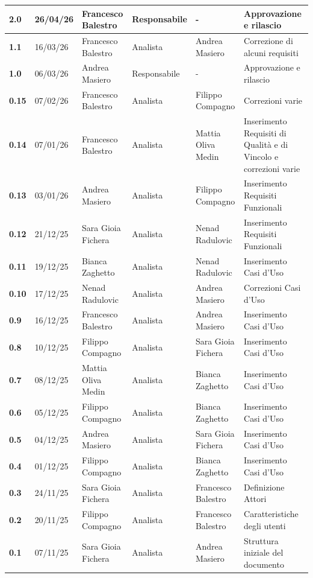 \documentclass[a4paper,12pt]{article}
\begin{document}
{\begin{longtable}{|p{1cm}|p{1.7cm}|p{3.5cm}|p{2.5cm}|p{2.5cm}|p{3.2cm}|}
            \textbf{2.0} & 26/04/26 & Francesco Balestro & Responsabile & - & Approvazione e rilascio \\
            \hline
            \textbf{1.1} & 16/03/26 & Francesco Balestro & Analista & Andrea Masiero & Correzione di alcuni requisiti \\
            \hline
            \textbf{1.0} & 06/03/26 & Andrea Masiero & Responsabile & - & Approvazione e rilascio \\
            \hline
            \textbf{0.15} & 07/02/26 & Francesco Balestro & Analista & Filippo Compagno & Correzioni varie \\
            \hline
            \textbf{0.14} & 07/01/26 & Francesco Balestro & Analista & Mattia Oliva Medin & Inserimento Requisiti di Qualità e di Vincolo e correzioni varie \\
            \hline
            \textbf{0.13} & 03/01/26 & Andrea Masiero & Analista & Filippo Compagno & Inserimento Requisiti Funzionali \\
            \hline
            \textbf{0.12} & 21/12/25 &  Sara Gioia Fichera & Analista & Nenad Radulovic & Inserimento Requisiti Funzionali \\
            \hline
            \textbf{0.11} & 19/12/25 & Bianca Zaghetto & Analista & Nenad Radulovic & Inserimento Casi d'Uso \\
            \hline
            \textbf{0.10} & 17/12/25 & Nenad Radulovic & Analista & Andrea Masiero & Correzioni Casi d'Uso \\
            \hline
            \textbf{0.9} & 16/12/25 & Francesco Balestro & Analista & Andrea Masiero & Inserimento Casi d'Uso \\
            \hline
            \textbf{0.8} & 10/12/25 & Filippo Compagno & Analista & Sara Gioia Fichera & Inserimento Casi d'Uso \\
            \hline
            \textbf{0.7} & 08/12/25 & Mattia Oliva Medin & Analista & Bianca Zaghetto & Inserimento Casi d'Uso \\
            \hline
            \textbf{0.6} & 05/12/25 & Filippo Compagno & Analista & Bianca Zaghetto & Inserimento Casi d'Uso \\
            \hline
            \textbf{0.5} & 04/12/25 & Andrea Masiero & Analista & Sara Gioia Fichera & Inserimento Casi d'Uso \\
            \hline
            \textbf{0.4} & 01/12/25 & Filippo Compagno & Analista & Bianca Zaghetto & Inserimento Casi d'Uso \\
            \hline
            \textbf{0.3} & 24/11/25 & Sara Gioia Fichera & Analista & Francesco Balestro &  Definizione Attori \\
            \hline
            \textbf{0.2} & 20/11/25 & Filippo Compagno & Analista & Francesco Balestro & Caratteristiche degli utenti \\
            \hline
            \rowcolor{white}
            \textbf{0.1} & 07/11/25 & Sara Gioia Fichera & Analista & Andrea Masiero & Struttura iniziale del documento \\
            \hline
        \end{longtable}
    }
    \newpage
    
\end{document}
